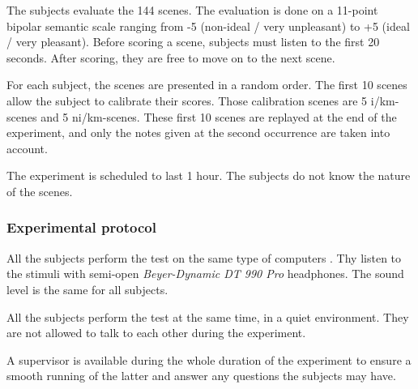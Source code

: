 \documentclass[twoside,twocolumn]{article}
\begin{document}

The subjects evaluate the 144 scenes. The evaluation is done on a 11-point bipolar semantic scale ranging from -5 (non-ideal / very unpleasant) to +5 (ideal / very pleasant). Before scoring a scene, subjects must listen to the first 20 seconds. After scoring, they are free to move on to the next scene.

For each subject, the scenes are presented in a random order. The first 10 scenes allow the subject to calibrate their scores. Those calibration scenes are  5 i/km-scenes and 5 ni/km-scenes. These first 10 scenes are replayed at the end of the experiment, and only the notes given at the second occurrence are taken into account.

The experiment is scheduled to last 1 hour. The subjects do not know the nature of the scenes.

\subsubsection*{Experimental protocol}


All the subjects perform the test on the same type of computers . Thy listen to the stimuli with semi-open \emph{Beyer-Dynamic DT 990 Pro} headphones. The sound level is the same for all subjects.


All the subjects perform the test at the same time, in a quiet environment. They are not allowed to talk to each other during the experiment.


A supervisor is available during the whole duration of the experiment to ensure a smooth running of the latter and answer any questions the subjects may have.
\end{document}
